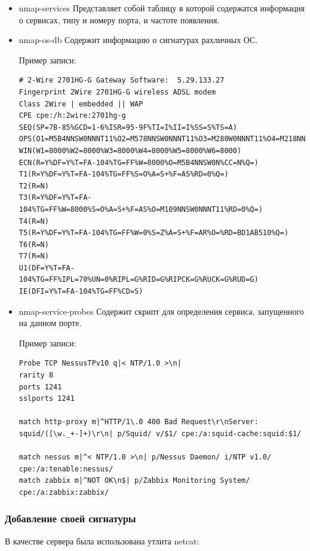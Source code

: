 \documentclass[10pt,a4paper]{article}
\begin{document}
\begin{itemize}
\item {nmap-services}
Представляет собой таблицу в которой содержатся информация о сервисах, типу и номеру порта, и частоте появления.

\item {nmap-os-db}
Содержит информацию о сигнатурах рахличных ОС. 

Пример записи:

\begin{lstlisting}
# 2-Wire 2701HG-G Gateway Software:  5.29.133.27
Fingerprint 2Wire 2701HG-G wireless ADSL modem
Class 2Wire | embedded || WAP
CPE cpe:/h:2wire:2701hg-g
SEQ(SP=7B-85%GCD=1-6%ISR=95-9F%TI=I%II=I%SS=S%TS=A)
OPS(O1=M5B4NNSW0NNNT11%O2=M578NNSW0NNNT11%O3=M280W0NNNT11%O4=M218NNSW0NNNT11%O5=M218NNSW0NNNT11%O6=M109NNSNNT11)
WIN(W1=8000%W2=8000%W3=8000%W4=8000%W5=8000%W6=8000)
ECN(R=Y%DF=Y%T=FA-104%TG=FF%W=8000%O=M5B4NNSW0N%CC=N%Q=)
T1(R=Y%DF=Y%T=FA-104%TG=FF%S=O%A=S+%F=AS%RD=0%Q=)
T2(R=N)
T3(R=Y%DF=Y%T=FA-104%TG=FF%W=8000%S=O%A=S+%F=AS%O=M109NNSW0NNNT11%RD=0%Q=)
T4(R=N)
T5(R=Y%DF=Y%T=FA-104%TG=FF%W=0%S=Z%A=S+%F=AR%O=%RD=BD1AB510%Q=)
T6(R=N)
T7(R=N)
U1(DF=Y%T=FA-104%TG=FF%IPL=70%UN=0%RIPL=G%RID=G%RIPCK=G%RUCK=G%RUD=G)
IE(DFI=Y%T=FA-104%TG=FF%CD=S)
\end{lstlisting}

\item {nmap-service-probes}
Содержит скрипт для определения сервиса, запущенного на данном порте. 

Пример записи:

\begin{lstlisting}
Probe TCP NessusTPv10 q|< NTP/1.0 >\n|
rarity 8
ports 1241
sslports 1241

match http-proxy m|^HTTP/1\.0 400 Bad Request\r\nServer: squid/([\w._+-]+)\r\n| p/Squid/ v/$1/ cpe:/a:squid-cache:squid:$1/

match nessus m|^< NTP/1.0 >\n| p/Nessus Daemon/ i/NTP v1.0/ cpe:/a:tenable:nessus/
match zabbix m|^NOT OK\n$| p/Zabbix Monitoring System/ cpe:/a:zabbix:zabbix/

\end{lstlisting}


\end{itemize}

\subsubsection{Добавление своей сигнатуры}

В качестве сервера была использована утлита netcat:
\end{document}
